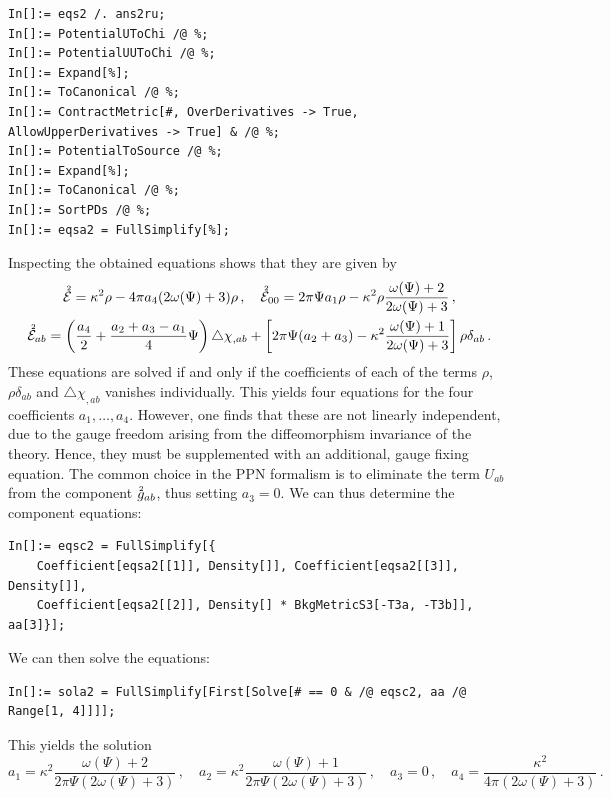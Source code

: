 \documentclass[notitlepage,a4paper,aps,prd,onecolumn,superscriptaddress,nofootinbib,groupedaddress,longbibliography]{revtex4-1}
\newcommand{\order}[2]{\accentset{#2}{#1}}
\begin{document}
\begin{lstlisting}
In[]:= eqs2 /. ans2ru;
In[]:= PotentialUToChi /@ %;
In[]:= PotentialUUToChi /@ %;
In[]:= Expand[%];
In[]:= ToCanonical /@ %;
In[]:= ContractMetric[#, OverDerivatives -> True, AllowUpperDerivatives -> True] & /@ %;
In[]:= PotentialToSource /@ %;
In[]:= Expand[%];
In[]:= ToCanonical /@ %;
In[]:= SortPDs /@ %;
In[]:= eqsa2 = FullSimplify[%];
\end{lstlisting}
Inspecting the obtained equations shows that they are given by
\begin{gather}
\order{\mathcal{E}}{2} = \kappa^2\rho - 4\pi a_4(2\omega(\Psi) + 3)\rho\,, \quad
\order{\mathcal{E}}{2}_{00} = 2\pi\Psi a_1\rho - \kappa^2\rho\frac{\omega(\Psi) + 2}{2\omega(\Psi) + 3}\,,\nonumber\\
\order{\mathcal{E}}{2}_{ab} = \left(\frac{a_4}{2} + \frac{a_2 + a_3 - a_1}{4}\Psi\right)\triangle\chi_{,ab} + \left[2\pi\Psi(a_2 + a_3) - \kappa^2\frac{\omega(\Psi) + 1}{2\omega(\Psi) + 3}\right]\rho\delta_{ab}\,.
\end{gather}
These equations are solved if and only if the coefficients of each of the terms \(\rho\), \(\rho\delta_{ab}\) and \(\triangle\chi_{,ab}\) vanishes individually. This yields four equations for the four coefficients \(a_1, \ldots, a_4\). However, one finds that these are not linearly independent, due to the gauge freedom arising from the diffeomorphism invariance of the theory. Hence, they must be supplemented with an additional, gauge fixing equation. The common choice in the PPN formalism is to eliminate the term \(U_{ab}\) from the component \(\order{g}{2}_{ab}\), thus setting \(a_3 = 0\). We can thus determine the component equations:
\begin{lstlisting}
In[]:= eqsc2 = FullSimplify[{
	Coefficient[eqsa2[[1]], Density[]], Coefficient[eqsa2[[3]], Density[]],
	Coefficient[eqsa2[[2]], Density[] * BkgMetricS3[-T3a, -T3b]], aa[3]}];
\end{lstlisting}
We can then solve the equations:
\begin{lstlisting}
In[]:= sola2 = FullSimplify[First[Solve[# == 0 & /@ eqsc2, aa /@ Range[1, 4]]]];
\end{lstlisting}
This yields the solution
\begin{equation}
a_1 = \kappa^2\frac{\omega(\Psi) + 2}{2\pi\Psi(2\omega(\Psi) + 3)}\,, \quad
a_2 = \kappa^2\frac{\omega(\Psi) + 1}{2\pi\Psi(2\omega(\Psi) + 3)}\,, \quad
a_3 = 0\,, \quad
a_4 = \frac{\kappa^2}{4\pi(2\omega(\Psi) + 3)}\,.
\end{equation}
\end{document}
